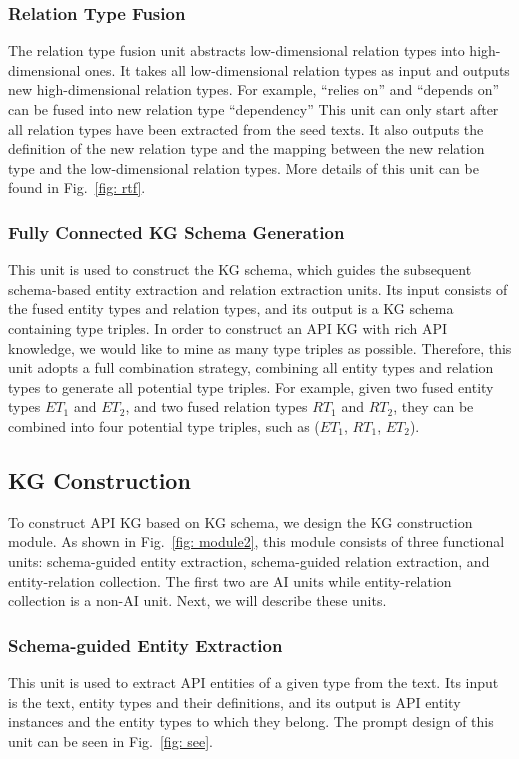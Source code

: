 \subsubsection{Relation Type Fusion}
The relation type fusion unit abstracts low-dimensional relation types into high-dimensional ones. 
It takes all low-dimensional relation types as input and outputs new high-dimensional relation types.
For example, ``relies on'' and ``depends on'' can be fused into new relation type ``dependency''
This unit can only start after all relation types have been extracted from the seed texts.
It also outputs the definition of the new relation type and the mapping between the new relation type and the low-dimensional relation types.
More details of this unit can be found in Fig.~\ref{fig: rtf}.

\subsubsection{Fully Connected KG Schema Generation}
This unit is used to construct the KG schema, which guides the subsequent schema-based entity extraction and relation extraction units.
Its input consists of the fused entity types and relation types, and its output is a KG schema containing type triples.
In order to construct an API KG with rich API knowledge, we would like to mine as many type triples as possible.
Therefore, this unit adopts a full combination strategy, combining all entity types and relation types to generate all potential type triples.
For example, given two fused entity types \textit{$ET_1$} and \textit{$ET_2$}, and two fused relation types \textit{$RT_1$} and \textit{$RT_2$}, they can be combined into four potential type triples, such as (\textit{$ET_1$}, \textit{$RT_1$}, \textit{$ET_2$}).

\vspace{-2mm}
\subsection{KG Construction}
To construct API KG based on KG schema, we design the KG construction module.
As shown in Fig.~\ref{fig: module2}, this module consists of three functional units: schema-guided entity extraction, schema-guided relation extraction, and entity-relation collection. 
The first two are AI units while entity-relation collection is a non-AI unit.
Next, we will describe these units.

\subsubsection{Schema-guided Entity Extraction}
This unit is used to extract API entities of a given type from the text. 
Its input is the text, entity types and their definitions, and its output is API entity instances and the entity types to which they belong.
The prompt design of this unit can be seen in Fig.~\ref{fig: see}.

